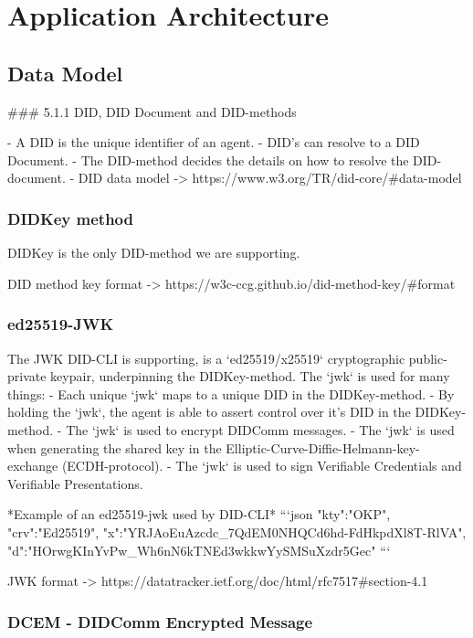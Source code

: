 \chapter{Application Architecture}

\section{Data Model}


### 5.1.1 DID, DID Document and DID-methods

- A DID is the unique identifier of an agent.
- DID's can resolve to a DID Document.
- The DID-method decides the details on how to resolve the DID-document.
- DID data model -> https://www.w3.org/TR/did-core/#data-model

\subsection{DIDKey method}

DIDKey is the only DID-method we are supporting.

DID method key format -> https://w3c-ccg.github.io/did-method-key/#format

\subsection{ed25519-JWK}

The JWK DID-CLI is supporting, is a `ed25519/x25519` cryptographic public-private keypair, underpinning the DIDKey-method. The `jwk` is used for many things:
- Each unique `jwk` maps to a unique DID in the DIDKey-method.
- By holding the `jwk`, the agent is able to assert control over it's DID in the DIDKey-method.
- The `jwk` is used to encrypt DIDComm messages.
- The `jwk` is used when generating the shared key in the Elliptic-Curve-Diffie-Helmann-key-exchange (ECDH-protocol).
- The `jwk` is used to sign Verifiable Credentials and Verifiable Presentations.

*Example of an ed25519-jwk used by DID-CLI*
```json
{
	"kty":"OKP",
	"crv":"Ed25519",
	"x":"YRJAoEuAzcdc_7QdEM0NHQCd6hd-FdHkpdXl8T-RlVA",
	"d":"HOrwgKInYvPw_Wh6nN6kTNEd3wkkwYySMSuXzdr5Gec"
}
```

JWK format -> https://datatracker.ietf.org/doc/html/rfc7517#section-4.1

\subsection{DCEM - DIDComm Encrypted Message}

